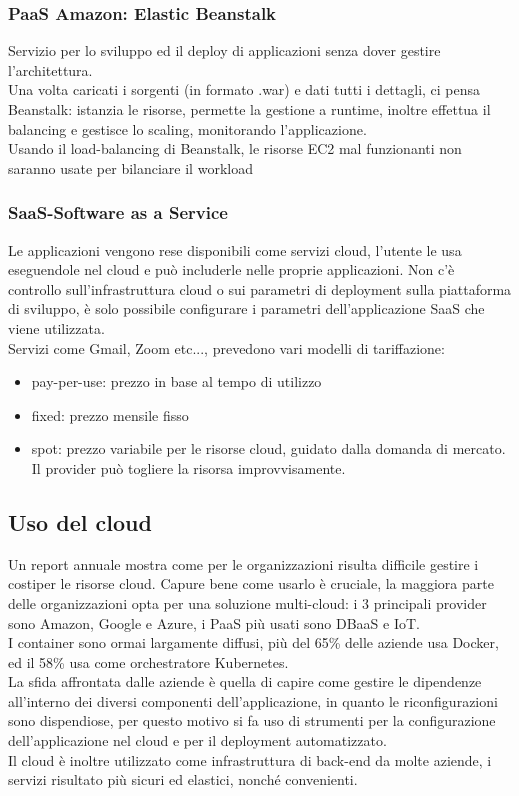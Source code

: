 \documentclass{article}
\begin{document}
\subsubsection{PaaS Amazon: Elastic Beanstalk}
Servizio per lo sviluppo ed il deploy di applicazioni senza dover gestire l'architettura. \\Una volta caricati i sorgenti (in formato .war) e dati tutti i dettagli, ci pensa Beanstalk: istanzia le risorse, permette la gestione a runtime, inoltre effettua il balancing e gestisce lo scaling, monitorando l'applicazione.\\ Usando il load-balancing di Beanstalk, le risorse EC2 mal funzionanti non saranno usate per bilanciare il workload
\subsubsection{SaaS-Software as a Service}
Le applicazioni vengono rese disponibili come servizi cloud, l'utente le usa eseguendole nel cloud e può includerle nelle proprie applicazioni. Non c'è controllo sull'infrastruttura cloud o sui parametri di deployment sulla piattaforma di sviluppo, è solo possibile configurare i parametri dell'applicazione SaaS che viene utilizzata.\\ Servizi come Gmail, Zoom etc..., prevedono vari modelli di tariffazione:
\begin{itemize}
\item pay-per-use: prezzo in base al tempo di utilizzo
\item fixed: prezzo mensile fisso
\item spot: prezzo variabile per le risorse cloud, guidato dalla domanda di mercato. Il provider può togliere la risorsa improvvisamente.
\end{itemize}
\subsection{Uso del cloud}
Un report annuale mostra come per le organizzazioni risulta difficile gestire i costiper le risorse cloud. Capure bene come usarlo è cruciale, la maggiora parte delle organizzazioni opta per una soluzione multi-cloud: i 3 principali provider sono Amazon, Google e Azure, i PaaS più usati sono DBaaS e IoT.\\ I container sono ormai largamente diffusi, più del 65\% delle aziende usa Docker, ed il 58\% usa come orchestratore Kubernetes.\\ La sfida affrontata dalle aziende è quella di capire come gestire le dipendenze all'interno dei diversi componenti dell'applicazione, in quanto le riconfigurazioni sono dispendiose, per questo motivo si fa uso di strumenti per la configurazione dell'applicazione nel cloud e per il deployment automatizzato.\\ Il cloud è inoltre utilizzato come infrastruttura di back-end da molte aziende, i servizi risultato più sicuri ed elastici, nonché convenienti.
\end{document}
